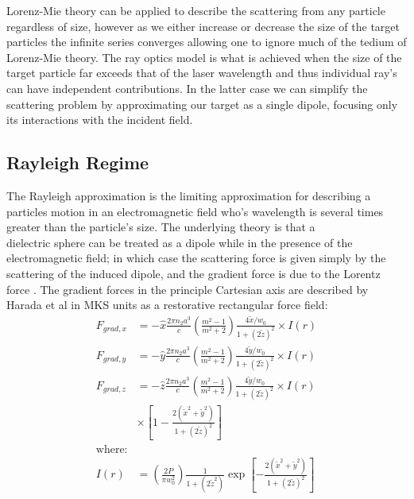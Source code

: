 Lorenz-Mie theory can be applied to describe the scattering from any 
particle regardless of size, however as we either increase or decrease 
the size of the target particles the infinite series converges allowing 
one to ignore much of the tedium of Lorenz-Mie theory. The ray optics 
model is what is achieved when the size of the target particle far exceeds that of the laser wavelength and thus individual ray's can have independent contributions. 
In the latter case we can simplify the scattering problem by approximating 
our target as a single dipole, focusing only its interactions with the 
incident field.

\subsection{Rayleigh Regime}

The Rayleigh approximation is the limiting approximation for describing 
a particles motion in an electromagnetic field who's wavelength is several 
times greater than the particle's size. The underlying theory is that a \\
dielectric sphere can be treated as a dipole while in the presence of the 
electromagnetic field; in which case the scattering force is given simply 
by the scattering of the induced dipole, and the gradient force is due 
to the Lorentz force \cite{Gordon1973}. The gradient forces in the 
principle Cartesian axis are described by Harada et al \cite{YasuhiroHarada1996} 
in MKS units as a restorative rectangular force field:
\begin{align}
  F_{grad,x}
  &=-\hat{x} \frac{2\pi n_2 a^3}{c}
    \left(\frac{m^2-1}{m^2+2}\right) \frac{4\tilde{x}/w_0}{1+(2\tilde{z})^2} \times I(r)
  \\
  F_{grad,y}
  &=-\hat{y} \frac{2\pi n_2 a^3}{c}
    \left(\frac{m^2-1}{m^2+2}\right) \frac{4\tilde{y}/w_0}{1+(2\tilde{z})^2} \times I(r)
  \\
  F_{grad,z}
  &=-\hat{z} \frac{2\pi n_2 a^3}{c}
    \left(\frac{m^2-1}{m^2+2}\right) \frac{4\tilde{y}/w_0}{1+(2\tilde{z})^2}
    \nonumber \times I(r)
  \\ 
  & \times \left[1-\frac{2(\tilde{x}^2+\tilde{y}^2)}{1+(2\tilde{z})^2} \right]
  \\
  \text{where:}
  \nonumber
  \\
	I(r) &= \left(\frac{2P}{\pi w_0^2}\right) \frac{1}{1+(2\tilde{z}^2)} 
	\exp \left[ - \frac{2(\tilde{x}^2+\tilde{y}^2)}{1+(2\tilde{z})^2} \right]
\end{align}

